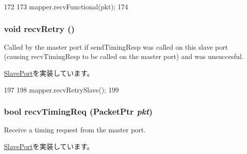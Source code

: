 \begin{DoxyCode}
172         {
173             mapper.recvFunctional(pkt);
174         }
\end{DoxyCode}
\hypertarget{classAddrMapper_1_1MapperSlavePort_a29cb5a4f98063ce6e9210eacbdb35298}{
\subsubsection[{recvRetry}]{\setlength{\rightskip}{0pt plus 5cm}void recvRetry ()}}
\label{classAddrMapper_1_1MapperSlavePort_a29cb5a4f98063ce6e9210eacbdb35298}
Called by the master port if sendTimingResp was called on this slave port (causing recvTimingResp to be called on the master port) and was unsuccesful. 

\hyperlink{classSlavePort_ac1ccc3bcf7ebabb20b57fab99b2be5b0}{SlavePort}を実装しています。


\begin{DoxyCode}
197         {
198             mapper.recvRetrySlave();
199         }
\end{DoxyCode}
\hypertarget{classAddrMapper_1_1MapperSlavePort_a3344d9dd0f83257feab5424e761f31c6}{
\subsubsection[{recvTimingReq}]{\setlength{\rightskip}{0pt plus 5cm}bool recvTimingReq ({\bf PacketPtr} {\em pkt})}}
\label{classAddrMapper_1_1MapperSlavePort_a3344d9dd0f83257feab5424e761f31c6}
Receive a timing request from the master port. 

\hyperlink{classSlavePort_abcece77e42f88ee41af8d3d01bb48253}{SlavePort}を実装しています。


